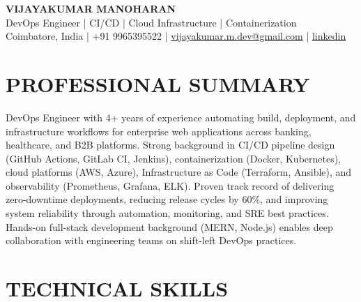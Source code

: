 \documentclass[11pt]{article}
\begin{document}
\pagestyle{empty}
\color{textgray}

\begin{center}
    {\bfseries\color{primaryblue}\fontsize{20}{20}\selectfont VIJAYAKUMAR MANOHARAN} \\[3pt]
    {\normalsize\color{accentblue} DevOps Engineer | CI/CD | Cloud Infrastructure | Containerization} \\[2pt]

    \color{textgray}
    \fontsize{10.5}{12}\selectfont
    Coimbatore, India \enspace | \enspace +91 9965395522 \enspace | \enspace
    \href{mailto:vijayakumar.m.dev@gmail.com}{vijayakumar.m.dev@gmail.com} \enspace | \enspace
    \href{https://www.linkedin.com/in/vijayakumar-manoharan-49a164175}{linkedin} \\
\end{center}

\section*{PROFESSIONAL SUMMARY}
DevOps Engineer with 4+ years of experience automating build, deployment, and infrastructure workflows for enterprise web applications across banking, healthcare, and B2B platforms. Strong background in CI/CD pipeline design (GitHub Actions, GitLab CI, Jenkins), containerization (Docker, Kubernetes), cloud platforms (AWS, Azure), Infrastructure as Code (Terraform, Ansible), and observability (Prometheus, Grafana, ELK). Proven track record of delivering zero-downtime deployments, reducing release cycles by 60\%, and improving system reliability through automation, monitoring, and SRE best practices. Hands-on full-stack development background (MERN, Node.js) enables deep collaboration with engineering teams on shift-left DevOps practices.

\section*{TECHNICAL SKILLS}
\end{document}
